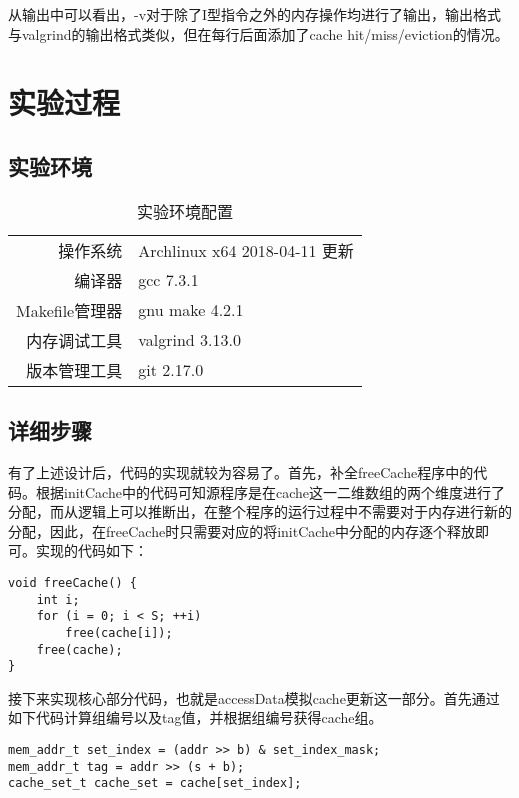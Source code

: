 \par 从输出中可以看出，-v对于除了I型指令之外的内存操作均进行了输出，输出格式与valgrind的输出格式类似，但在每行后面添加了cache hit/miss/eviction的情况。

\section{实验过程}
\label{sec:shi_yan_guo_cheng_}

\subsection{实验环境}
\label{sub:shi_yan_huan_jing_}
\begin{table}[htb]
    \centering
    \caption{实验环境配置}
    \label{tab:label}
    \begin{tabular}{r l}
        \toprule
        操作系统        & Archlinux x64 2018-04-11 更新\\
        编译器          & gcc 7.3.1 \\
        Makefile管理器  & gnu make 4.2.1 \\
        内存调试工具    & valgrind 3.13.0 \\
        版本管理工具    & git 2.17.0 \\
        \bottomrule
    \end{tabular}
\end{table}

\subsection{详细步骤}
\label{sub:shi_yan_guo_cheng_}

\par 有了上述设计后，代码的实现就较为容易了。首先，补全freeCache程序中的代码。根据initCache中的代码可知源程序是在cache这一二维数组的两个维度进行了分配，而从逻辑上可以推断出，在整个程序的运行过程中不需要对于内存进行新的分配，因此，在freeCache时只需要对应的将initCache中分配的内存逐个释放即可。实现的代码如下：
\begin{lstlisting}
void freeCache() {
    int i;
    for (i = 0; i < S; ++i)
        free(cache[i]);
    free(cache);
}
\end{lstlisting}

\par 接下来实现核心部分代码，也就是accessData模拟cache更新这一部分。首先通过如下代码计算组编号以及tag值，并根据组编号获得cache组。
\begin{lstlisting}
mem_addr_t set_index = (addr >> b) & set_index_mask;
mem_addr_t tag = addr >> (s + b);
cache_set_t cache_set = cache[set_index];
\end{lstlisting}

